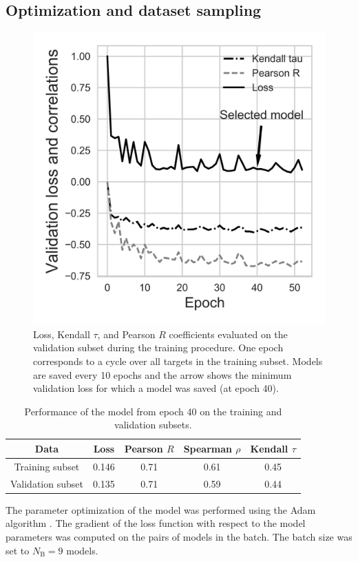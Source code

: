 \documentclass{bioinfo}
\begin{document}
\subsection{Optimization and dataset sampling}
%
%
\begin{figure}[!tpb]
    \centering
    \includegraphics[width=\linewidth]{image4.png}
    \caption{Loss, Kendall $\tau$, and Pearson $R$ coefficients
      evaluated on the validation subset during the training
      procedure.  One epoch corresponds to a cycle over all targets in
      the training subset. Models are saved every 10 epochs and the
      arrow shows the minimum validation loss for which a model was
      saved (at epoch 40).}
    \label{Fig:TrainingLoss}
\end{figure}
\begin{table}[!t]
  \caption {Performance of the model from epoch 40 on the training and
    validation subsets.}
\begin{tabular}{ c | c | c | c | c }
    Data & Loss & Pearson $R$ & Spearman $\rho$ & Kendall $\tau$ \\
    \hline
    Training subset     &0.146 &0.71 &0.61 &0.45 \\
    Validation subset   &0.135 &0.71 &0.59 &0.44 \\ \hline
\end{tabular}
\label{Tbl:TrainingResults}
\end{table}
The parameter optimization of the model was performed using the Adam
algorithm \citep{kingma2014adam}. The gradient of the loss function
with respect to the model parameters was computed on the pairs of
models in the batch. The batch size was set to $N_\text{B} = 9$
models.
\end{document}
